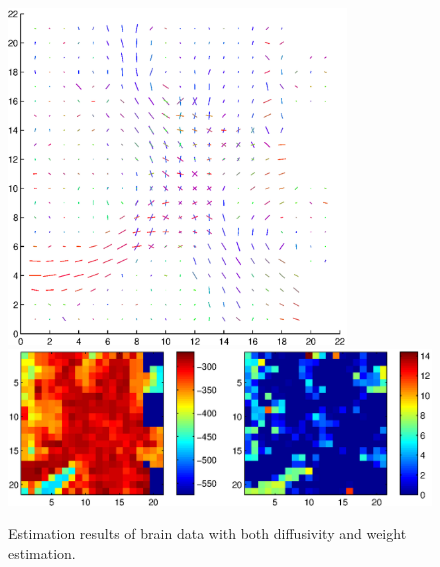 \documentclass{article}
\begin{document}
\begin{figure}[H]
  \caption{Estimation results of brain data with both diffusivity and weight estimation.}
  \centering
  \includegraphics[width=0.8\textwidth]{figures/brain_bas_weights_diffus_dir.eps}
  \includegraphics[width=\textwidth]{figures/brain_bas_weights_diffus_like.eps}
\end{figure}

\end{document}
